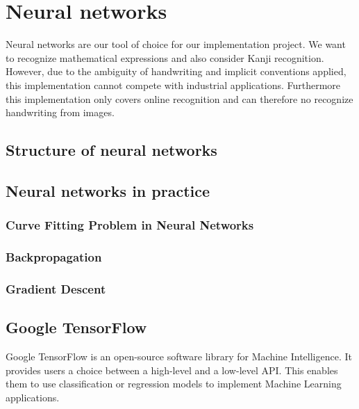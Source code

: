 \chapter{Neural networks}
%
Neural networks are our tool of choice for our implementation project.
We want to recognize mathematical expressions and also consider Kanji recognition.
However, due to the ambiguity of handwriting and implicit conventions applied,
this implementation cannot compete with industrial applications.
Furthermore this implementation only covers online recognition and can therefore
no recognize handwriting from images.

\section{Structure of neural networks}



\section{Neural networks in practice}

\subsection{Curve Fitting Problem in Neural Networks}


\subsection{Backpropagation}


\subsection{Gradient Descent}



\section{Google TensorFlow}
\label{sec:nn-tensorflow}
%
Google TensorFlow is an open-source software library for Machine Intelligence.
It provides users a choice between a high-level and a low-level API.
This enables them to use classification or regression models to implement
Machine Learning applications.

